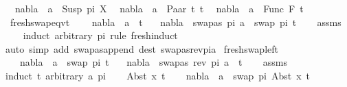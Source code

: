 \begin{isabellebody}
\ \ {\isachardoublequoteopen}nabla\ {\isasymturnstile}\ a\ {\isasymsharp}\ Susp\ pi\ X{\isachardoublequoteclose}\isanewline
\ \ {\isachardoublequoteopen}nabla\ {\isasymturnstile}\ a\ {\isasymsharp}\ Paar\ t{}\ t{}{\isachardoublequoteclose}\isanewline
\ \ {\isachardoublequoteopen}nabla\ {\isasymturnstile}\ a\ {\isasymsharp}\ Func\ F\ t{\isachardoublequoteclose}\isanewline
\isanewline
{}\isamarkupfalse%
\ fresh{\isacharunderscore}{\kern0pt}swap{\isacharunderscore}{\kern0pt}eqvt{\isacharcolon}{\kern0pt}\ \isanewline
\ \ \ {\isachardoublequoteopen}nabla\ {\isasymturnstile}\ a\ {\isasymsharp}\ t{\isachardoublequoteclose}\isanewline
\ \ \ {\isachardoublequoteopen}nabla\ {\isasymturnstile}\ swapas\ pi\ a\ {\isasymsharp}\ swap\ pi\ t{\isachardoublequoteclose}\isanewline
%
\isadelimproof
\ \ %
\endisadelimproof
%
\isatagproof
{}\isamarkupfalse%
\ assms\isanewline
\ \ \isamarkupfalse%
\ {\isacharparenleft}{\kern0pt}induct\ arbitrary{\isacharcolon}{\kern0pt}\ pi\ rule{\isacharcolon}{\kern0pt}\ fresh{\isachardot}{\kern0pt}induct{\isacharparenright}{\kern0pt}\isanewline
{\isacharparenleft}{\kern0pt}auto\ simp\ add{\isacharcolon}{\kern0pt}\ swapas{\isacharunderscore}{\kern0pt}append\ dest{\isacharcolon}{\kern0pt}\ swapas{\isacharunderscore}{\kern0pt}rev{\isacharunderscore}{\kern0pt}pi{\isacharunderscore}{\kern0pt}a{\isacharparenright}{\kern0pt}%
\endisatagproof
{\isafoldproof}%
%
\isadelimproof
\isanewline
%
\endisadelimproof
\isanewline
\isanewline
{}\isamarkupfalse%
\ fresh{\isacharunderscore}{\kern0pt}swap{\isacharunderscore}{\kern0pt}left{\isacharcolon}{\kern0pt}\ \isanewline
\ \ \ {\isachardoublequoteopen}nabla\ {\isasymturnstile}\ a\ {\isasymsharp}\ swap\ pi\ t{\isachardoublequoteclose}\isanewline
\ \ \ {\isachardoublequoteopen}nabla\ {\isasymturnstile}\ swapas\ {\isacharparenleft}{\kern0pt}rev\ pi{\isacharparenright}{\kern0pt}\ a\ {\isasymsharp}\ t{\isachardoublequoteclose}\isanewline
%
\isadelimproof
\ \ %
\endisadelimproof
%
\isatagproof
{}\isamarkupfalse%
\ assms\isanewline
{}\isamarkupfalse%
{\isacharparenleft}{\kern0pt}induct\ t\ arbitrary{\isacharcolon}{\kern0pt}\ a\ pi{\isacharparenright}{\kern0pt}\isanewline
\ \ \isamarkupfalse%
\ {\isacharparenleft}{\kern0pt}Abst\ x{}\ t{\isacharparenright}{\kern0pt}\isanewline
\ \ \isamarkupfalse%
\ {\isachardoublequoteopen}nabla\ {\isasymturnstile}\ a\ {\isasymsharp}\ swap\ pi\ {\isacharparenleft}{\kern0pt}Abst\ x{}\ t{\isacharparenright}{\kern0pt}{\isachardoublequoteclose}\ \isamarkupfalse%

\end{isabellebody}
